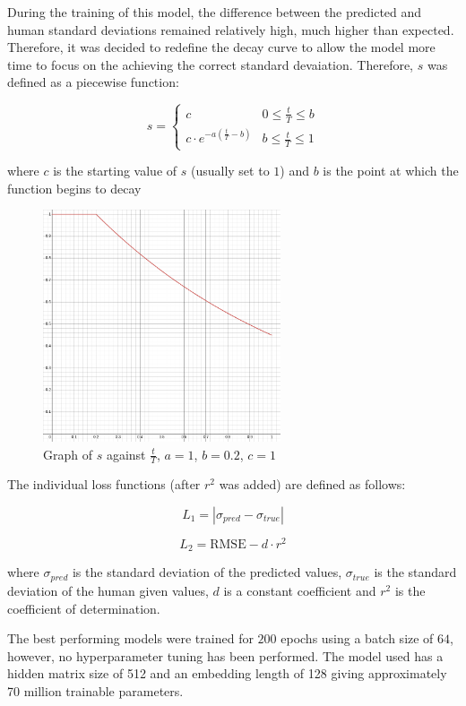 \documentclass[11pt]{article}
\begin{document}
During the training of this model, the difference between the predicted and human standard deviations remained relatively high, much higher than expected. Therefore, it was decided to redefine the decay curve to allow the model more time to focus on the achieving the correct standard devaiation. Therefore, \(s\) was defined as a piecewise function:

\[ s = \begin{cases}
c & 0\leq \frac{t}{T} \leq b \\
c \cdot e^{-a(\frac{t}{T} - b)} & b \leq \frac{t}{T} \leq 1
\end{cases} \]

where \(c\) is the starting value of \(s\) (usually set to \(1\)) and \(b\) is the point at which the function begins to decay

\begin{figure}[htbp]
\centering
\includegraphics[width=7cm]{./decay_wb.png}
\caption{Graph of \(s\) against \(\frac{t}{T}\), \(a=1\), \(b=0.2\), \(c=1\) \label{fig:exponential_wb}}
\end{figure}

The individual loss functions (after \(r^2\) was added) are defined as follows:

$$ L_1 = |\sigma_{pred} - \sigma_{true}| $$

$$ L_2 = \text{RMSE}-d \cdot r^2 $$

where \(\sigma_{pred}\) is the standard deviation of the predicted values, \(\sigma_{true}\) is the standard deviation of the human given values, \(d\) is a constant coefficient and \(r^2\) is the coefficient of determination.

The best performing models were trained for \(200\) epochs using a batch size of \(64\), however, no hyperparameter tuning has been performed. The model used has a hidden matrix size of 512 and an embedding length of 128 giving approximately 70 million trainable parameters.
\end{document}
